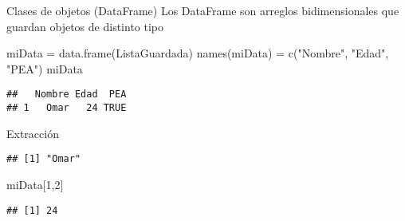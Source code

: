 \documentclass[
  10,
  ignorenonframetext,
]{beamer}
\newenvironment{Shaded}{\begin{snugshade}}{\end{snugshade}}
\newcommand{\DecValTok}[1]{\textcolor[rgb]{0.00,0.00,0.81}{#1}}
\newcommand{\FunctionTok}[1]{\textcolor[rgb]{0.00,0.00,0.00}{#1}}
\newcommand{\NormalTok}[1]{#1}
\newcommand{\OtherTok}[1]{\textcolor[rgb]{0.56,0.35,0.01}{#1}}
\newcommand{\SpecialCharTok}[1]{\textcolor[rgb]{0.00,0.00,0.00}{#1}}
\newcommand{\StringTok}[1]{\textcolor[rgb]{0.31,0.60,0.02}{#1}}
\begin{document}
\begin{frame}[fragile]{Clases de objetos (DataFrame)}
\protect\hypertarget{clases-de-objetos-dataframe}{}
Los DataFrame son arreglos bidimensionales que guardan objetos de
distinto tipo

\begin{Shaded}
\begin{Highlighting}[]
\NormalTok{miData }\OtherTok{=} \FunctionTok{data.frame}\NormalTok{(ListaGuardada)}
\FunctionTok{names}\NormalTok{(miData) }\OtherTok{=} \FunctionTok{c}\NormalTok{(}\StringTok{"Nombre"}\NormalTok{, }\StringTok{"Edad"}\NormalTok{, }\StringTok{"PEA"}\NormalTok{)}
\NormalTok{miData}
\end{Highlighting}
\end{Shaded}

\begin{verbatim}
##   Nombre Edad  PEA
## 1   Omar   24 TRUE
\end{verbatim}

Extracción

\begin{Shaded}
\end{Shaded}

\begin{verbatim}
## [1] "Omar"
\end{verbatim}

\begin{Shaded}
\begin{Highlighting}[]
\NormalTok{miData[}\DecValTok{1}\NormalTok{,}\DecValTok{2}\NormalTok{]}
\end{Highlighting}
\end{Shaded}

\begin{verbatim}
## [1] 24
\end{verbatim}
\end{frame}
\end{document}
